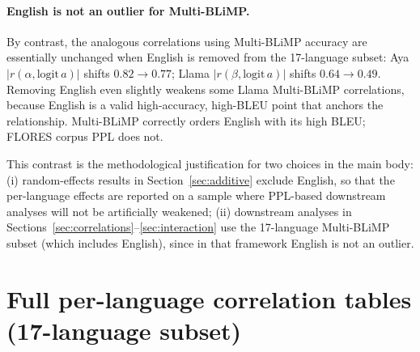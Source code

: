 \documentclass[11pt]{article}
\begin{document}
\paragraph{English is not an outlier for Multi-BLiMP.}
By contrast, the analogous correlations using Multi-BLiMP accuracy
are essentially unchanged when English is removed from the 17-language
subset: Aya $|r(\alpha, \text{logit}\,a)|$ shifts $0.82 \to 0.77$;
Llama $|r(\beta, \text{logit}\,a)|$ shifts $0.64 \to 0.49$. Removing
English even slightly weakens some Llama Multi-BLiMP correlations,
because English is a valid high-accuracy, high-BLEU point that
anchors the relationship. Multi-BLiMP correctly orders English with
its high BLEU; FLORES corpus PPL does not.

This contrast is the methodological justification for two choices in
the main body: (i) random-effects results in
Section~\ref{sec:additive} exclude English, so that the per-language
effects are reported on a sample where PPL-based downstream analyses
will not be artificially weakened; (ii) downstream analyses in
Sections~\ref{sec:correlations}--\ref{sec:interaction} use the
17-language Multi-BLiMP subset (which includes English), since in that
framework English is not an outlier.

\section{Full per-language correlation tables (17-language subset)}
\label{app:corr-tables}
\end{document}
